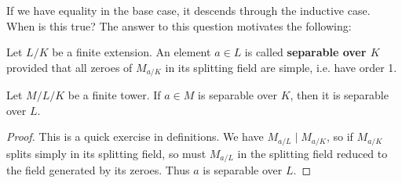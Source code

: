 \begin{rmk}
	If we have equality in the base case, it descends through the inductive case. When is this true? The answer to this question motivates the following:
\end{rmk}

\begin{defn} \label{Defn 4, Feb 10}
	Let $L/K$ be a finite extension. An element $a \in L$ is called \textbf{separable over $K$} provided that all zeroes of $M_{a/K}$ in its splitting field are simple, i.e. have order 1.
\end{defn}

\begin{fact} \label{Fact 5, Feb 10}
	Let $M/L/K$ be a finite tower. If $a \in M$ is separable over $K$, then it is separable over $L$.
\end{fact}

\begin{proof}
	This is a quick exercise in definitions. We have $M_{a/L} \mid M_{a/K}$, so if $M_{a/K}$ splits simply in its splitting field, so must $M_{a/L}$ in the splitting field reduced to the field generated by its zeroes. Thus $a$ is separable over $L$.
\end{proof}

